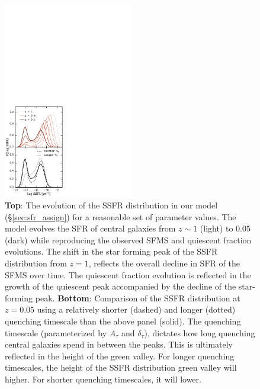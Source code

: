 \begin{figure}
\begin{center}
\includegraphics[width=0.5\textwidth]{figs/cenq/SSFRevol.pdf}
\caption{
{\bf Top}: The evolution of the SSFR distribution in 
our model (\S \ref{sec:sfr_assign}) for a reasonable set of 
parameter values. The model evolves the SFR of central
galaxies from $z \sim 1$ (light) to $0.05$ (dark) while reproducing 
the observed SFMS and quiescent fraction evolutions. The shift in 
the star forming peak of the SSFR distribution from $z = 1$, 
reflects the overall decline in SFR of the SFMS over time. 
The quiescent fraction evolution is reflected in the growth 
of the quiescent peak accompanied by the decline of the 
star-forming peak. 
{\bf Bottom}: Comparison of the SSFR distribution at $z = 0.05$ 
using a relatively shorter (dashed) and longer (dotted) quenching 
timescale than the above panel (solid). The quenching timescale 
(parameterized by $A_\tau$ and $\delta_\tau$), dictates how long 
quenching central galaxies spend in between the peaks. This is 
ultimately reflected in the height of the green valley. For longer 
quenching timescales, the height of the SSFR distribution green 
valley will higher. For shorter quenching timescales, it will lower.
}
\label{fig:SSFRevol}
\end{center}
\end{figure}

